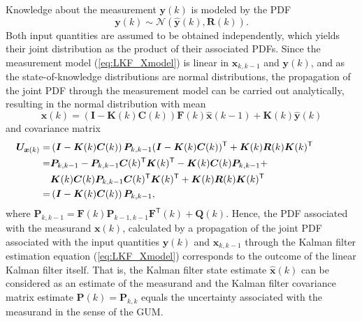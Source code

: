 \documentclass[10pt]{article}
\begin{document}
\begin{spacing}{1}
Knowledge about the measurement $\bm{y}(k)$ is modeled by the PDF
\[ \bm{y}(k) \sim \mathcal{N} \left( \hat{\bm{y}}(k),  \bm{R}(k) \right) .\]
Both input quantities are assumed to be obtained independently, which yields their joint distribution as the product of their associated PDFs. Since the measurement model (\ref{eq:LKF_Xmodel}) is linear in $\bm{x}_{k,k-1}$ and $\bm{y}(k)$, and as the state-of-knowledge distributions are normal distributions, the propagation of the joint PDF through the measurement model can be carried out analytically, resulting in the normal distribution with mean
\begin{equation}
	\hat{\bm{x}}(k) = \left( \bm{I} - \bm{K}(k)\bm{C}(k) \right)\bm{F}(k)\hat{\bm{x}}(k-1) + \bm{K}(k)\hat{\bm{y}}(k)
\end{equation}
and covariance matrix
\begin{align}
\hspace{-8ex}		\bm{U}_{\bm{x}(k)} =&\left( \bm{I}-\bm{K}(k)\bm{C}(k) \right)\bm{P}_{k,k-1}(\bm{I}-\bm{K}(k)\bm{C}(k))^{\mathsf{T}} + \bm{K}(k)\bm{R}(k)\bm{K}(k)^{\mathsf{T}} \\
\hspace{-8ex}	        =& \bm{P}_{k,k-1} - \bm{P}_{k,k-1} \bm{C}(k)^{\mathsf{T}}\bm{K}(k)^{\mathsf{T}} - \bm{K}(k)\bm{C}(k)\bm{P}_{k,k-1} + \\
\hspace{-8ex}	        &\bm{K}(k)\bm{C}(k)\bm{P}_{k,k-1}\bm{C}(k)^{\mathsf{T}}\bm{K}(k)^{\mathsf{T}} + \bm{K}(k)\bm{R}(k)\bm{K}(k)^{\mathsf{T}} \\
\hspace{-8ex}	        =&\left( \bm{I}-\bm{K}(k)\bm{C}(k) \right)\bm{P}_{k,k-1} ,
\end{align}
where $\bm{P}_{k,k-1} = \bm{F}(k)\bm{P}_{k-1,k-1}\bm{F}^{\mathsf{T}}(k) + \bm{Q}(k)$.
Hence, the PDF associated with the measurand $\bm{x}(k)$, calculated by a propagation of the joint PDF associated with the input quantities $\bm{y}(k)$ and $\bm{x}_{k,k-1}$ through the Kalman filter estimation equation (\ref{eq:LKF_Xmodel}) corresponds to the outcome of the linear Kalman filter itself. That is, the Kalman filter state estimate $\hat{\bm{x}}(k)$ can be considered as an estimate of the measurand and the Kalman filter covariance matrix estimate $\bm{P}(k)=\bm{P}_{k,k}$ equals the uncertainty associated with the measurand in the sense of the GUM.


\end{spacing}
\end{document}
